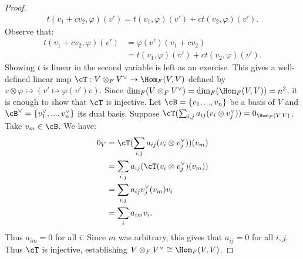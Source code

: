 \begin{proof}
\begin{equation*}
\begin{split}
                    t(v_1 + cv_2,\varphi)(v') = t(v_1,\varphi)(v') + ct(v_2,\varphi)(v').
                \end{split}
                \end{equation*}
            Observe that:
                \begin{equation*}
                \begin{split}
                    t(v_1 + cv_2,\varphi)(v')
                    & = \varphi(v')(v_1 + cv_2) \\
                    & = t(v_1,\varphi)(v') + ct(v_2,\varphi)(v').
                \end{split}
                \end{equation*}
            Showing $t$ is linear in the second variable is left as an exercise. This gives a well-defined linear map $\cT:V \otimes_F V^\vee \rightarrow \Hom_F(V,V)$ defined by $v \otimes \varphi \mapsto (v' \mapsto \varphi(v')v)$. Since $\dim_F(V \otimes_F V^\vee) = \dim_F(\Hom_F(V,V)) = n^2$, it is enough to show that $\cT$ is injective. Let $\cB = \{v_1,...,v_n\}$ be a basis of $V$ and $\cB^\vee = \{v_1^\vee,...,v_n^\vee\}$ its dual basis. Suppose $\cT(\sum_{i,j}a_{ij}(v_i \otimes v_j^\vee)) = 0_{\Hom_F(V,V)}$. Take $v_m \in \cB$. We have:
                \begin{equation*}
                \begin{split}
                    0_V
                    & = \cT(\sum_{i,j}a_{ij}(v_i \otimes v_j^\vee))(v_m) \\
                    & = \sum_{i,j}a_{ij}(\cT(v_i \otimes v_j^\vee)(v_m)) \\
                    & = \sum_{i,j}a_{ij}v_j^\vee(v_m)v_i \\
                    & = \sum_{i}a_{im} v_i.
                \end{split}
                \end{equation*}
            Thus $a_{im} = 0$ for all $i$. Since $m$ was arbitrary, this gives that $a_{ij} = 0$ for all $i,j$. Thus $\cT$ is injective, establishing $V \otimes_F V^\vee \cong \Hom_F(V,V)$.
        \end{proof}

